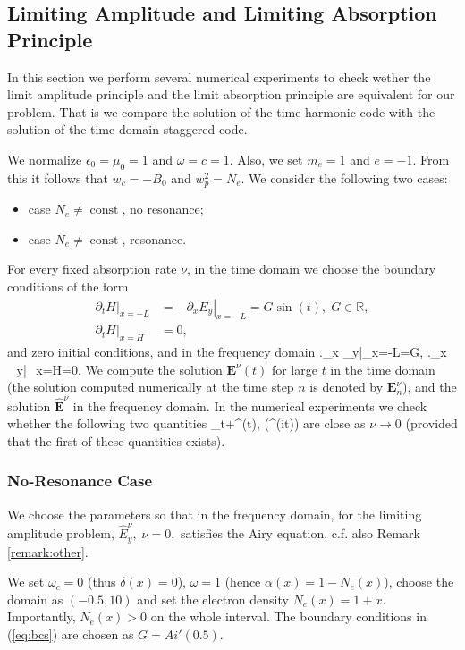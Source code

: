 \subsection{Limiting Amplitude and Limiting Absorption Principle}
In this section we perform several numerical experiments to check wether the limit amplitude
principle and the limit
absorption principle are equivalent for our problem.
That is we compare the solution of the time harmonic code with the solution of the time domain staggered code.

We normalize  $\epsilon_0=\mu_0=1$ and $\omega=c=1$. 
Also, we set $m_e=1$ and $e=-1$. From this it follows that $w_c=-B_0$ and $w_p^2=N_e$. 
We consider the following two cases:
\begin{itemize}
 \item case $N_e\neq \operatorname{const}$, no resonance;
 \item case $N_e\neq \operatorname{const}$, resonance.
\end{itemize}
For every fixed absorption rate $\nu$, in the time domain we choose the boundary conditions of the form
\begin{align}
\label{eq:bcs}
\left.\partial_t H\right|_{x=-L}&=-\left.\partial_x E_y\right|_{x=-L}=G\sin(t),\; G\in \mathbb{R}, \\
 \nonumber
 \left.\partial_t H\right|_{x=H}&=0,
\end{align}
and zero initial conditions, and in the frequency domain
\bealn
 \left.\partial_x _y\right|_{x=-L}=G,\; \left.\partial_x _y\right|_{x=H}=0.
\eealn
We compute the solution $\mathbf{E}^{\nu}(t)$ for large $t$ in the time domain (the solution computed numerically at the time step $n$ is denoted by $\mathbf{E}^{\nu}_{n}$), and the solution $\hat{\mathbf{E}}^{\nu}$ in the frequency domain. 
In the numerical experiments we check whether the following two quantities
\ben
\lim_{t\rightarrow+\infty}^{\nu}(t),  \Im\left(^{\nu}\exp(it)\right)
\een
are close as $\nu\rightarrow 0$ (provided that the first of these quantities exists). 
\subsubsection{No-Resonance Case}
We choose the parameters so that in the frequency domain, for the limiting amplitude problem, $\hat{E}_{y}^{\nu},\; \nu=0,$ satisfies 
the Airy equation, c.f. also Remark \ref{remark:other}. 

We set $\omega_c=0$ (thus $\delta(x)=0$), $\omega=1$ (hence $\alpha(x)=1-N_e(x)$), 
choose the domain as $(-0.5, 10)$ and set the electron density $N_e(x)=1+x$. Importantly, $N_e(x)>0$ on the whole interval.
The boundary conditions in (\ref{eq:bcs}) are chosen as $G=Ai'(0.5)$. 

